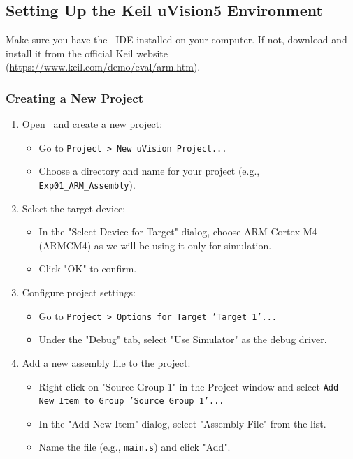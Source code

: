 \subsection{Setting Up the Keil uVision5 Environment}
Make sure you have the \keil\ IDE installed on your computer. If not, download and install it from the official Keil website (\url{https://www.keil.com/demo/eval/arm.htm}).
\subsubsection{Creating a New Project}
\begin{enumerate}[nosep]
    \item Open \keil\ and create a new project:
    \begin{itemize}[nosep]
        \item Go to \texttt{Project > New uVision Project...}
        \item Choose a directory and name for your project (e.g., \texttt{Exp01\_ARM\_Assembly}).
    \end{itemize}
    \item Select the target device:
    \begin{itemize}[nosep]
        \item In the "Select Device for Target" dialog, choose ARM Cortex-M4 (ARMCM4) as we will be using it only for simulation.
        \item Click "OK" to confirm.
    \end{itemize}
    \item Configure project settings:
    \begin{itemize}[nosep]
        \item Go to \texttt{Project > Options for Target 'Target 1'...}
        \item Under the "Debug" tab, select "Use Simulator" as the debug driver.
    \end{itemize}
    \item Add a new assembly file to the project:
    \begin{itemize}[nosep]
        \item Right-click on "Source Group 1" in the Project window and select \texttt{Add New Item to Group 'Source Group 1'...}
        \item In the "Add New Item" dialog, select "Assembly File" from the list.
        \item Name the file (e.g., \texttt{main.s}) and click "Add".
    \end{itemize}

\end{enumerate}

